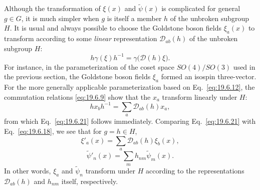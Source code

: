 Although the transformation of $\xi(x)$ and $\widetilde\psi(x)$ is complicated for general $g\in G$, it is much simpler when $g$ is itself a member $h$ of the unbroken subgroup $H$. It is usual and always possible to choose the Goldstone boson fields $\xi_a(x)$ to transform according to some \emph{linear} representation $\mathcal D_{ab}(h)$ of the unbroken subgroup $H$:
\begin{equation}
h\gamma(\xi)h^{-1}
=\gamma\bigl(\mathcal D(h)\xi\bigr).
\tag{19.6.21}\label{eq:19.6.21}
\end{equation}
For instance, in the parameterization of the coset space $SO(4)/SO(3)$ used in the previous section, the Goldstone boson fields $\xi_a$ formed an isospin three-vector. For the more generally applicable parameterization based on Eq.~\eqref{eq:19.6.12}, the commutation relations \eqref{eq:19.6.9} show that the $x_a$ transform linearly under $H$:
\begin{equation}
hx_bh^{-1}=\sum_a\mathcal D_{ab}(h)x_a,
\tag{19.6.22}\label{eq:19.6.22}
\end{equation}
from which Eq.~\eqref{eq:19.6.21} follows immediately. Comparing Eq.~\eqref{eq:19.6.21} with Eq.~\eqref{eq:19.6.18}, we see that for $g=h\in H$,
\begin{equation}
\xi'_a(x)=\sum_a\mathcal D_{ab}(h)\xi_b(x),
\tag{19.6.23}\label{eq:19.6.23}
\end{equation}
\begin{equation}
\widetilde\psi'_n(x)=\sum_mh_{nm}\widetilde\psi_m(x).
\tag{19.6.24}\label{eq:19.6.24}
\end{equation}
In other words, $\xi_a$ and $\widetilde\psi_n$ transform under $H$ according to the representations $\mathcal D_{ab}(h)$ and $h_{nm}$ itself, respectively.

